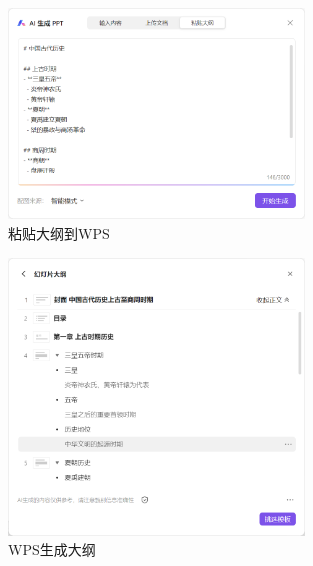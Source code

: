 \centering
\begin{figure}[H] %
    \centering %
    \includegraphics[width=0.7\textwidth]{sections/images/image-20250210192847219.png} %
    \caption{粘贴大纲到WPS} %
    \label{Fig.main1} %
\end{figure}%

\centering
\begin{figure}[H] %
    \centering %
    \includegraphics[width=0.7\textwidth]{sections/images/image-20250210192936323.png} %
    \caption{WPS生成大纲} %
    \label{Fig.main1} %
\end{figure}%

